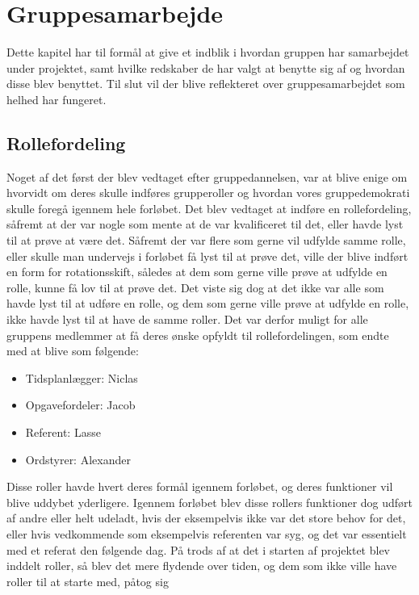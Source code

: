 \chapter{Gruppesamarbejde}\label{Gruppesamarbejde}
Dette kapitel har til formål at give et indblik i hvordan gruppen har samarbejdet under projektet, samt hvilke redskaber de har valgt at benytte sig af og hvordan disse blev benyttet. Til slut vil der blive reflekteret over gruppesamarbejdet som helhed har fungeret.

\section{Rollefordeling}\label{Rollefordeling-1}

Noget af det først der blev vedtaget efter gruppedannelsen, var at blive enige om hvorvidt om deres skulle indføres grupperoller og hvordan vores gruppedemokrati skulle foregå igennem hele forløbet. Det blev vedtaget at indføre en rollefordeling, såfremt at der var nogle som mente at de var kvalificeret til det, eller havde lyst til at prøve at være det. Såfremt der var flere som gerne vil udfylde samme rolle, eller skulle man undervejs i forløbet få lyst til at prøve det, ville der blive indført en form for rotationsskift, således at dem som gerne ville prøve at udfylde en rolle, kunne få lov til at prøve det.
	Det viste sig dog at det ikke var alle som havde lyst til at udføre en rolle, og dem som gerne ville prøve at udfylde en rolle, ikke havde lyst til at have de samme roller. Det var derfor muligt for alle gruppens medlemmer at få deres ønske opfyldt til rollefordelingen, som endte med at blive som følgende:

\begin{itemize}
\item Tidsplanlægger: Niclas
\item Opgavefordeler: Jacob
\item Referent: Lasse
\item Ordstyrer: Alexander
\end{itemize}

Disse roller havde hvert deres formål igennem forløbet, og deres funktioner vil blive uddybet yderligere. Igennem forløbet blev disse rollers funktioner dog udført af andre eller helt udeladt, hvis der eksempelvis ikke var det store behov for det, eller hvis vedkommende som eksempelvis referenten var syg, og det var essentielt med et referat den følgende dag. På trods af at det i starten af projektet blev inddelt roller, så blev det mere flydende over tiden, og dem som ikke ville have roller til at starte med, påtog sig 
	
